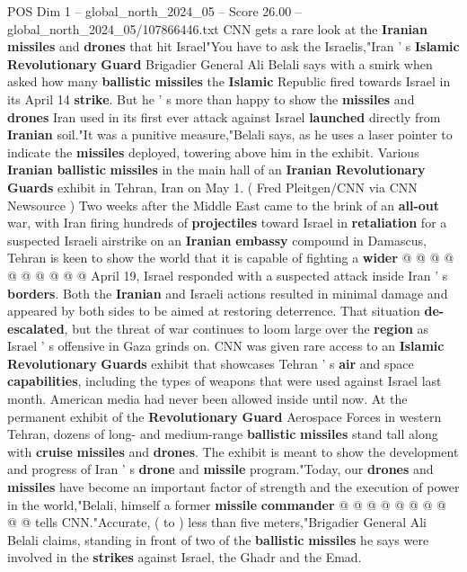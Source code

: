 \begin{textsample}{POS Dim 1 – global\_north\_2024\_05 – Score 26.00 – global\_north\_2024\_05/107866446.txt}  \label{ex:f1_pos_402}
CNN gets a rare look at the \textbf{Iranian} \textbf{missiles} and \textbf{drones} that hit Israel"You have to ask the Israelis,"Iran ' s \textbf{Islamic} \textbf{Revolutionary} \textbf{Guard} Brigadier General Ali Belali says with a smirk when asked how many \textbf{ballistic} \textbf{missiles} the \textbf{Islamic} Republic fired towards Israel in its April 14 \textbf{strike}.
But he ' s more than happy to show the \textbf{missiles} and \textbf{drones} Iran used in its first ever attack against Israel \textbf{launched} directly from \textbf{Iranian} soil."It was a punitive measure,"Belali says, as he uses a laser pointer to indicate the \textbf{missiles} deployed, towering above him in the exhibit.
Various \textbf{Iranian} \textbf{ballistic} \textbf{missiles} in the main hall of an \textbf{Iranian} \textbf{Revolutionary} \textbf{Guards} exhibit in Tehran, Iran on May 1. ( Fred Pleitgen/CNN via CNN Newsource ) Two weeks after the Middle East came to the brink of an \textbf{all-out} war, with Iran firing hundreds of \textbf{projectiles} toward Israel in \textbf{retaliation} for a suspected Israeli airstrike on an \textbf{Iranian} \textbf{embassy} compound in Damascus, Tehran is keen to show the world that it is capable of fighting a \textbf{wider} @ @ @ @ @ @ @ @ @ @ April 19, Israel responded with a suspected attack inside Iran ' s \textbf{borders}.
Both the \textbf{Iranian} and Israeli actions resulted in minimal damage and appeared by both sides to be aimed at restoring deterrence.
That situation \textbf{de-escalated}, but the threat of war continues to loom large over the \textbf{region} as Israel ' s offensive in Gaza grinds on.
CNN was given rare access to an \textbf{Islamic} \textbf{Revolutionary} \textbf{Guards} exhibit that showcases Tehran ' s \textbf{air} and space \textbf{capabilities}, including the types of weapons that were used against Israel last month.
American media had never been allowed inside until now.
At the permanent exhibit of the \textbf{Revolutionary} \textbf{Guard} Aerospace Forces in western Tehran, dozens of long- and medium-range \textbf{ballistic} \textbf{missiles} stand tall along with \textbf{cruise} \textbf{missiles} and \textbf{drones}.
The exhibit is meant to show the development and progress of Iran ' s \textbf{drone} and \textbf{missile} program."Today, our \textbf{drones} and \textbf{missiles} have become an important factor of strength and the execution of power in the world,"Belali, himself a former \textbf{missile} \textbf{commander} @ @ @ @ @ @ @ @ @ @ tells CNN."Accurate, ( to ) less than five meters,"Brigadier General Ali Belali claims, standing in front of two of the \textbf{ballistic} \textbf{missiles} he says were involved in the \textbf{strikes} against Israel, the Ghadr and the Emad.

\end{textsample}
